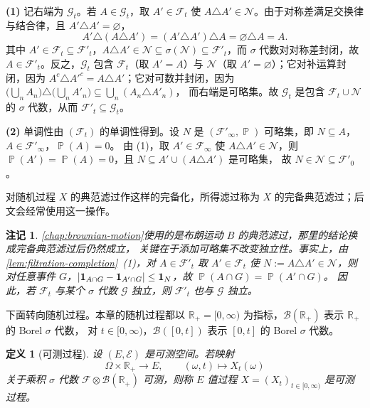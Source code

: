 \documentclass[UTF8,11pt,a4paper,oneside,fontset=fandol]{ctexrep}
\makeatletter
\numberwithin{equation}{section}
\theoremstyle{zhthm}
\newtheorem{definition}[theorem]{定义}
\newtheorem{remark}[theorem]{注记}
\renewenvironment{proof}[1][\proofname]{\par
  \pushQED{\qed}%
  \normalfont\topsep6\p@\@plus6\p@\relax
  \trivlist
  \item[\hskip\labelsep\bfseries#1\hspace{0.5em}]\ignorespaces
}{%
  \popQED\endtrivlist\@endpefalse
}
\renewcommand{\proofname}{证明}
\newcommand{\R}{\mathbb{R}}
\newcommand{\B}{\mathcal{B}}
\newcommand{\F}{\mathcal{F}}
\newcommand{\G}{\mathcal{G}}
\DeclareMathOperator{\Prob}{\mathbb{P}}
\newcommand{\ind}[1]{\mathbf{1}_{#1}}
\DeclarePairedDelimiter{\abs}{\lvert}{\rvert}
\makeatother
\begin{document}
\begin{proof}
\textbf{(1)} 记右端为 $\G_t$。若 $A\in\G_t$，取 $A'\in\F_t$ 使 $A\triangle A'\in\mathcal N$。由于对称差满足交换律与结合律，且 $A'\triangle A'=\varnothing$，
\[
  A'\triangle(A\triangle A')=(A'\triangle A')\triangle A=\varnothing\triangle A=A .
\]
其中 $A'\in\F_t\subseteq\F'_t$，$A\triangle A'\in\mathcal N\subseteq\sigma(\mathcal N)\subseteq\F'_t$，而 $\sigma$ 代数对对称差封闭，故 $A\in\F'_t$。反之，$\G_t$ 包含 $\F_t$（取 $A'=A$）与 $\mathcal N$（取 $A'=\varnothing$）；它对补运算封闭，因为
$A^c\triangle A'^c=A\triangle A'$；它对可数并封闭，因为 $\bigl(\bigcup_nA_n\bigr)\triangle\bigl(\bigcup_nA'_n\bigr)\subseteq\bigcup_n(A_n\triangle A'_n)$，
而右端是可略集。故 $\G_t$ 是包含 $\F_t\cup\mathcal N$ 的 $\sigma$ 代数，从而 $\F'_t\subseteq\G_t$。

\textbf{(2)} 单调性由 $(\F_t)$ 的单调性得到。设 $N$ 是 $(\F'_\infty,\Prob)$ 可略集，即 $N\subseteq A$，$A\in\F'_\infty$，$\Prob(A)=0$。
由 (1)，取 $A'\in\F_\infty$ 使 $A\triangle A'\in\mathcal N$，则 $\Prob(A')=\Prob(A)=0$，且 $N\subseteq A'\cup(A\triangle A')$ 是可略集，
故 $N\in\mathcal N\subseteq\F'_0$。
\end{proof}

对随机过程 $X$ 的典范滤过作这样的完备化，所得滤过称为 $X$ 的完备典范滤过；后文会经常使用这一操作。

\begin{remark}
\label{rem:completed-canonical-filtration}
\cref{chap:brownian-motion}使用的是布朗运动 $B$ 的典范滤过，那里的结论换成完备典范滤过后仍然成立，
关键在于添加可略集不改变独立性。事实上，由\cref{lem:filtration-completion}~(1)，对 $A\in\F'_t$ 取 $A'\in\F_t$ 使
$N:=A\triangle A'\in\mathcal N$，则对任意事件 $G$，$\abs{\ind{A\cap G}-\ind{A'\cap G}}\le\ind N$，故 $\Prob(A\cap G)=\Prob(A'\cap G)$。
因此，若 $\F_t$ 与某个 $\sigma$ 代数 $\G$ 独立，则 $\F'_t$ 也与 $\G$ 独立。
\end{remark}

下面转向随机过程。本章的随机过程都以 $\R_+=[0,\infty)$ 为指标，$\B(\R_+)$ 表示 $\R_+$ 的 Borel $\sigma$ 代数，
对 $t\in[0,\infty)$，$\B([0,t])$ 表示 $[0,t]$ 的 Borel $\sigma$ 代数。

\begin{definition}[可测过程]
\label{def:measurable-process}
设 $(E,\mathcal E)$ 是可测空间。若映射
\[
  \Omega\times\R_+\to E,\qquad (\omega,t)\mapsto X_t(\omega)
\]
关于乘积 $\sigma$ 代数 $\F\otimes\B(\R_+)$ 可测，则称 $E$ 值过程 $X=(X_t)_{t\in[0,\infty)}$ 是可测过程。
\end{definition}
\end{document}
